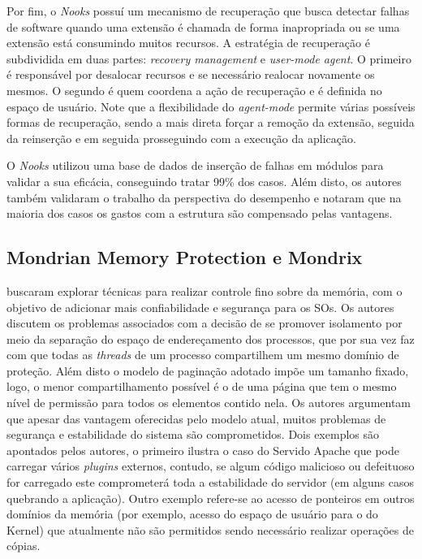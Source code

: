 Por fim, o \emph{Nooks} possuí um mecanismo de recuperação que busca detectar
falhas de software quando uma extensão é chamada de forma inapropriada ou se
uma extensão está consumindo muitos recursos. A estratégia de recuperação é
subdividida em duas partes: \emph{recovery management} e \emph{user-mode
agent}. O primeiro é responsável por desalocar recursos e se necessário
realocar novamente os mesmos. O segundo é quem coordena a ação de recuperação e
é definida no espaço de usuário. Note que a flexibilidade do \emph{agent-mode}
permite várias possíveis formas de recuperação, sendo a mais direta forçar a
remoção da extensão, seguida da reinserção e em seguida prosseguindo com a
execução da aplicação.

O \emph{Nooks} utilizou uma base de dados de inserção de falhas em módulos para
validar a sua eficácia, conseguindo tratar 99\% dos casos. Além disto, os
autores também validaram o trabalho da perspectiva do desempenho e notaram que
na maioria dos casos os gastos com a estrutura são compensado pelas vantagens.

\subsection{Mondrian Memory Protection e Mondrix}

\cite{mmp} buscaram explorar técnicas para realizar controle fino sobre da
memória, com o objetivo de adicionar mais confiabilidade e segurança para os
SOs. Os autores discutem os problemas associados com a decisão de se promover
isolamento por meio da separação do espaço de endereçamento dos processos, que
por sua vez faz com que todas as \emph{threads} de um processo compartilhem um
mesmo domínio de proteção. Além disto o modelo de paginação adotado impõe um
tamanho fixado, logo, o menor compartilhamento possível é o de uma página que
tem o mesmo nível de permissão para todos os elementos contido nela. Os autores
argumentam que apesar das vantagem oferecidas pelo modelo atual, muitos
problemas de segurança e estabilidade do sistema são comprometidos. Dois
exemplos são apontados pelos autores, o primeiro ilustra o caso do Servido
Apache que pode carregar vários \textit{plugins} externos, contudo, se algum
código malicioso ou defeituoso for carregado este comprometerá toda a
estabilidade do servidor (em alguns casos quebrando a aplicação). Outro exemplo
refere-se ao acesso de ponteiros em outros domínios da memória (por exemplo,
acesso do espaço de usuário para o do Kernel) que atualmente não são permitidos
sendo necessário realizar operações de cópias.

